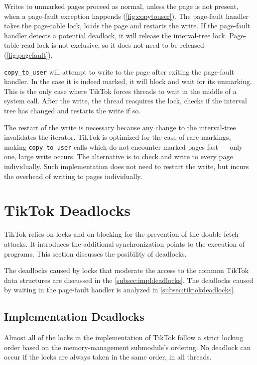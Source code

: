 \documentclass[conference]{IEEEtran}
\newcommand{\sysname}{TikTok}
\begin{document}
Writes to unmarked pages proceed as normal, unless the page is not present, when
a page-fault exception happends (\autoref{fig:copytouser}). The page-fault
handler takes the page-table lock, loads the page and restarts the write. If the
page-fault handler detects a potential deadlock, it will release the
interval-tree lock. Page-table read-lock is not exclusive, so it does not need
to be released (\autoref{fig:pagefault}).

\texttt{copy\_to\_user} will attempt to write to the page after exiting the
page-fault handler. In the case it is indeed marked, it will block and wait for
its unmarking. This is the only case where \sysname{} forces threads to wait in
the middle of a system call. After the write, the thread reaquires the lock,
checks if the interval tree has changed and restarts the write if so.

The restart of the write is necessary because any change to the interval-tree
invalidates the iterator. \sysname{} is optimized for the case of rare markings,
making \texttt{copy\_to\_user} calls which do not encounter marked pages fast
--- only one, large write occurs. The alternative is to check and write to every
page individually. Such implementation does not need to restart the write, but
incurs the overhead of writing to pages individually.

\section{TikTok Deadlocks}
\label{sec:deadlocks}

\sysname{} relies on locks and on blocking for the prevention of the
double-fetch attacks. It introduces the additional synchronization points to the
execution of programs. This section discusses the posibility of deadlocks.

The deadlocks caused by locks that moderate the access to the common \sysname{}
data structures are discussed in the \autoref{subsec:impldeadlocks}. The
deadlocks caused by waiting in the page-fault handler is analyzed in
\autoref{subsec:tiktokdeadlocks}.

\subsection{Implementation Deadlocks}
\label{subsec:impldeadlocks}

Almost all of the locks in the implementation of \sysname{} follow a strict
locking order based on the memory-management submodule's ordering. No deadlock
can occur if the locks are always taken in the same order, in all threads.
\end{document}
